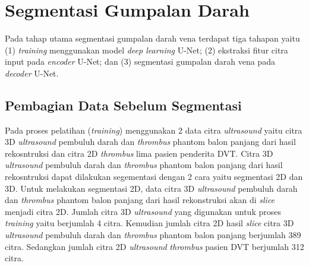 {%
\section{Segmentasi Gumpalan Darah}
Pada tahap utama segmentasi gumpalan darah vena terdapat tiga tahapan yaitu (1) \textit{training} menggunakan model \textit{deep learning} U-Net; (2) ekstraksi fitur citra input pada \textit{encoder} U-Net; dan (3) segmentasi gumpalan darah vena pada \textit{decoder} U-Net.

\subsection{Pembagian Data Sebelum Segmentasi}
Pada proses pelatihan (\textit{training}) menggunakan 2 data citra \textit{ultrasound} yaitu citra 3D \textit{ultrasound} pembuluh darah dan \textit{thrombus} phantom balon panjang dari hasil rekosntruksi dan citra 2D \textit{thrombus} lima pasien penderita DVT. Citra 3D \textit{ultrasound} pembuluh darah dan \textit{thrombus} phantom balon panjang dari hasil rekosntruksi dapat dilakukan segementasi dengan 2 cara yaitu segmentasi 2D dan 3D. Untuk melakukan segmentasi 2D, data citra 3D \textit{ultrasound} pembuluh darah dan \textit{thrombus} phantom balon panjang dari hasil rekonstruksi akan di \textit{slice} menjadi citra 2D. Jumlah citra 3D \textit{ultrasound} yang digunakan untuk proses \textit{training} yaitu berjumlah 4 citra. Kemudian jumlah citra 2D hasil \textit{slice} citra 3D \textit{ultrasound} pembuluh darah dan \textit{thrombus} phantom balon panjang berjumlah 389 citra. Sedangkan jumlah citra 2D \textit{ultrasound} \textit{thrombus} pasien DVT berjumlah 312 citra. 

}
